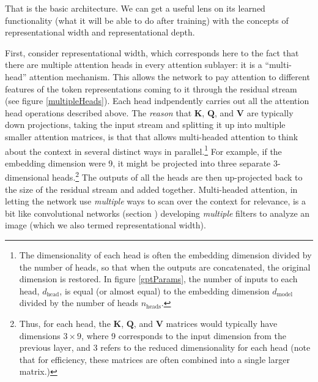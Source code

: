 That is the basic architecture. We can get a useful lens on its learned
functionality (what it will be able to do after training) with the concepts of
representational width and representational depth.
 
First, consider representational width, which corresponds here to the fact that
there are multiple attention heads in every attention sublayer: it is a
``multi-head'' attention mechanism. This allows the network to pay attention to
different features of the token representations coming to it through the
residual stream (see figure \ref{multipleHeads}). Each head indpendently
carries out all the attention head operations described above. The
\emph{reason} that $\textbf{K}$, $\textbf{Q}$, and $\textbf{V}$ are typically
down projections, taking the input stream and splitting it up into multiple
smaller attention matrices, is that that allows multi-headed attention to think
about the context in several distinct ways in parallel.\footnote{The
dimensionality of each head is often the embedding dimension divided by the
number of heads, so that when the outputs are concatenated, the original
dimension is restored. In figure \ref{gptParams}, the number of inputs to each
head, $d_\text{head}$, is equal (or almost equal) to the embedding dimension
$d_\text{model}$ divided by the number of heads $n_\text{heads}$.} For example,
if the embedding dimension were 9, it might be projected into three separate
3-dimensional heads.\footnote{Thus, for each head, the $\textbf{K}$,
$\textbf{Q}$, and $\textbf{V}$ matrices would typically have dimensions $3
\times 9$, where 9 corresponds to the input dimension from the previous layer,
and 3 refers to the reduced dimensionality for each head (note that for
efficiency, these matrices are often combined into a single larger matrix.)}
The outputs of all the heads are then up-projected back to the size of the
residual stream and added together. Multi-headed attention, in letting the
network use \emph{multiple} ways to scan over the context for relevance, is a
bit like convolutional networks (section )
developing \emph{multiple} filters to analyze an image (which we also termed
representational width).


